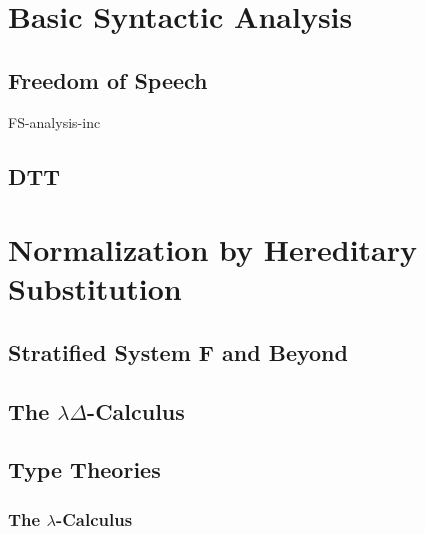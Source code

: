 \documentclass[phd,appendix,dedicationpage,ackpage,epigraphpage]{uithesis}
\begin{document}
\part{Basic Syntactic Analysis}
\label{part:basic-analysis}

\chapter{Freedom of Speech}
\label{chap:freedom_of_speech_anal}
{FS-analysis-inc}

\chapter{DTT}
\label{chap:dtt}



\part{Normalization by Hereditary Substitution}
\label{part:norm-hs}

\chapter{Stratified System F and Beyond}
\label{chap:stratified_system_f_and_beyond}


\chapter{The $\lambda\Delta$-Calculus}
\label{chap:the_lambdadelta-calculus}



\appendix

\chapter{Type Theories}
\label{chap:type_theories}
\section{The $\lambda$-Calculus}
\label{sec:the_lambda-calculus}
\Lamall{}
\end{document}
